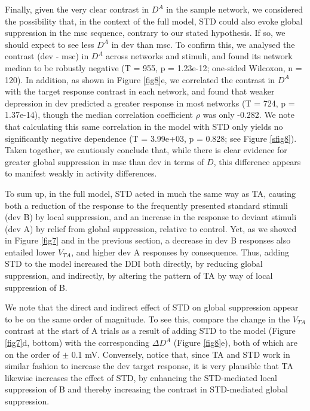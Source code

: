 \documentclass[pdflatex,referee,iicol,sn-basic]{sn-jnl}
\theoremstyle{thmstyleone}%
\theoremstyle{thmstyletwo}%
\theoremstyle{thmstylethree}%
\begin{document}
Finally, given the very clear contrast in $D^A$ in the sample network, we considered the possibility that, in the context of the full model, STD could also evoke global suppression in the msc sequence, contrary to our stated hypothesis. If so, we should expect to see less $D^A$ in dev than msc. To confirm this, we analysed the contrast (dev - msc) in $D^A$ across networks and stimuli, and found its network median to be robustly negative (T = 955, p = 1.23e-12; one-sided Wilcoxon, n = 120). In addition, as shown in Figure \ref{fig8}e, we correlated the contrast in $D^A$ with the target response contrast in each network, and found that weaker depression in dev predicted a greater response in most networks (T = 724, p = 1.37e-14), though the median correlation coefficient $\rho$ was only -0.282. We note that calculating this same correlation in the model with STD only yields no significantly negative dependence (T = 3.99e+03, p = 0.828; see Figure \ref{sfig8}). Taken together, we cautiously conclude that, while there is clear evidence for greater global suppression in msc than dev in terms of $D$, this difference appears to manifest weakly in activity differences.

To sum up, in the full model, STD acted in much the same way as TA, causing both a reduction of the response to the frequently presented standard stimuli (dev B) by local suppression, and an increase in the response to deviant stimuli (dev A) by relief from global suppression, relative to control. Yet, as we showed in Figure \ref{fig7} and in the previous section, a decrease in dev B responses also entailed lower $V_{TA}$, and higher dev A responses by consequence. Thus, adding STD to the model increased the DDI both directly, by reducing global suppression, and indirectly, by altering the pattern of TA by way of local suppression of B.

We note that the direct and indirect effect of STD on global suppression appear to be on the same order of magnitude. To see this, compare the change in the $V_{TA}$ contrast at the start of A trials as a result of adding STD to the model (Figure \ref{fig7}d, bottom) with the corresponding $\Delta D^A$ (Figure \ref{fig8}e), both of which are on the order of $\pm$ 0.1 mV. Conversely, notice that, since TA and STD work in similar fashion to increase the dev target response, it is very plausible that TA likewise increases the effect of STD, by enhancing the STD-mediated local suppression of B and thereby increasing the contrast in STD-mediated global suppression.
\end{document}

